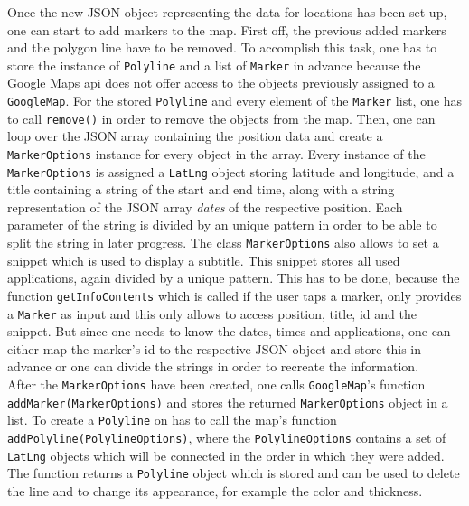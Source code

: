Once  the new JSON object representing the data for locations has been set up, one can start to add markers to the map. First off, the previous added markers and the polygon line have to be removed. To accomplish this task, one has to store the instance of \lstinline$Polyline$ and a list of \lstinline$Marker$ in advance because the Google Maps api does not offer access to the objects previously assigned to a \lstinline{GoogleMap}. For the stored \lstinline$Polyline$ and every element of the \lstinline$Marker$ list, one has to call \lstinline$remove()$ in order to remove the objects from the map. Then, one can loop over the JSON array containing the position data and create a \lstinline$MarkerOptions$ instance for every object in the array. Every instance of the \lstinline$MarkerOptions$ is assigned a \lstinline$LatLng$ object storing latitude and longitude, and a title containing a string of the start and end time, along with a string representation of the JSON array \emph{dates} of the respective position. Each parameter of the string is divided by an unique pattern in order to be able to split the string in later progress. The class \lstinline$MarkerOptions$ also allows to set a snippet which is used to display a subtitle. This snippet stores all used applications,  again divided by a unique pattern. This has to be done, because the function \lstinline$getInfoContents$ which is called if the user taps a marker, only provides a \lstinline$Marker$ as input and this only allows to access position, title, id and the snippet. But since one needs to know the dates, times and applications, one can either map the marker's id to the respective JSON object and store this in advance or one can divide the strings in order to recreate the information.\\
After the \lstinline{MarkerOptions} have been created, one calls \lstinline$GoogleMap$'s function \lstinline$addMarker(MarkerOptions)$ and stores the returned \lstinline$MarkerOptions$ object in a list. To create a \lstinline$Polyline$ on has to call the map's function \lstinline$addPolyline(PolylineOptions)$, where the \lstinline$PolylineOptions$ contains a set of \lstinline$LatLng$ objects which will be connected in the order in which they were added. The function returns a \lstinline$Polyline$ object which is stored and can be used to delete the line and to change its appearance, for example the color and thickness.

